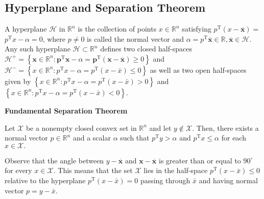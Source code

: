 \documentclass[english]{latex4ei_sheet}
\begin{document}
\begin{sectionbox}
\subsection{Hyperplane and Separation Theorem}

A hyperplane $\mathcal{H}$ in $\mathbb{R}^{n}$ is the collection of points $x \in \mathbb{R}^{n}$ satisfying $p^{\mathrm{T}}(x-\overline{\boldsymbol{x}})=$ $p^{\mathrm{T}} x-\alpha=0$, where $p \neq 0$ is called the normal vector and $\alpha=p^{\mathrm{T}} \overline{\boldsymbol{x}} \in \mathbb{R}, \overline{\boldsymbol{x}} \in \mathcal{H} .$ Any such hyperplane $\mathcal{H} \subset \mathbb{R}^{n}$ defines two closed half-spaces $\mathcal{H}^{+}=\left\{\boldsymbol{x} \in \mathbb{R}^{n}: \boldsymbol{p}^{\mathrm{T}} \boldsymbol{x}-\alpha=\boldsymbol{p}^{\mathrm{T}}(\boldsymbol{x}-\overline{\boldsymbol{x}}) \geq 0\right\}$ and $\mathcal{H}^{-}=\left\{x \in \mathbb{R}^{n}: p^{\mathrm{T}} x-\alpha=p^{\mathrm{T}}(x-\bar{x}) \leq 0\right\}$ as well as two open half-spaces given by $\left\{x \in \mathbb{R}^{n}: p^{\mathrm{T}} x-\alpha=p^{\mathrm{T}}(x-\bar{x})>0\right\}$ and $\left\{x \in \mathbb{R}^{n}: p^{\mathrm{T}} x-\alpha=p^{\mathrm{T}}(x-\bar{x})<0\right\}$.

\textbf{Fundamental Separation Theorem}
\begin{emphbox}
Let $\mathcal{X}$ be a nonempty closed convex set in $\mathbb{R}^{n}$ and let $y \notin \mathcal{X}$. Then, there exists a normal vector $p \in \mathbb{R}^{n}$ and a scalar $\alpha$ such that $p^{\mathrm{T}} y>\alpha$ and $p^{\mathrm{T}} x \leq \alpha$ for each $x \in \mathcal{X} .$
\end{emphbox}

Observe that the angle between $y-\overline{\boldsymbol{x}}$ and $\boldsymbol{x}-\overline{\boldsymbol{x}}$ is greater than or equal to $90^{\circ}$ for every $x \in \mathcal{X}$. This means that the set $\mathcal{X}$ lies in the half-space $p^{\mathrm{T}}(x-\bar{x}) \leq 0$ relative to the hyperplane $p^{\mathrm{T}}(x-\bar{x})=0$ passing through $\bar{x}$ and having normal vector $p=y-\bar{x}$.
\end{sectionbox}
\end{document}
